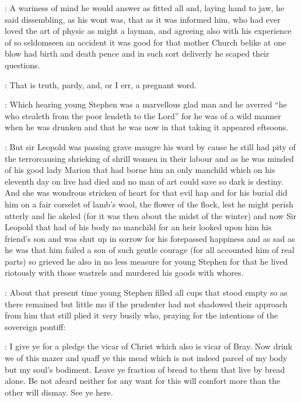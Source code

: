:
A wariness of mind he would answer as fitted all and,
laying hand to
jaw,
he said dissembling,
as his wont was,
that as it was informed him,
who had ever loved the art of physic as might a layman,
and agreeing also
with his experience of so seldomseen an accident it was good for that
mother Church belike at one blow had birth and death pence and in such
sort deliverly he scaped their questions.

\dixon:
That is truth,
pardy,
and,
or I err,
a pregnant word.

:
Which hearing young Stephen was a marvellous glad man and he averred
“he who stealeth from the poor lendeth to the Lord” for he was of a wild
manner when he was drunken and that he was now in that taking it appeared
eftsoons.


:
But sir Leopold was passing grave maugre his word by cause he still
had pity of the terrorcausing shrieking of shrill women in their labour
and as he was minded of his good lady Marion that had borne him an only
manchild which on his eleventh day on live had died and no man of art
could save so dark is destiny.
And she was wondrous stricken of heart for
that evil hap and for his burial did him on a fair corselet of lamb's
wool,
the flower of the flock,
lest he might perish utterly and lie
akeled (for it was then about the midst of the winter) and now Sir
Leopold that had of his body no manchild for an heir looked upon him his
friend's son and was shut up in sorrow for his forepassed happiness and
as sad as he was that him failed a son of such gentle courage (for all
accounted him of real parts) so grieved he also in no less measure for
young Stephen for that he lived riotously with those wastrels and
murdered his goods with whores.



:
About that present time young Stephen filled all cups that stood
empty so as there remained but little mo if the prudenter had not shadowed
their approach from him that still plied it very busily who,
praying for
the intentions of the sovereign pontiff:

\stephen:
I give ye for a pledge the vicar of Christ which also is vicar of
Bray.
Now drink we of this mazer and quaff ye this mead which is not
indeed parcel of my body but my soul's bodiment.
Leave ye fraction of
bread to them that live by bread alone.
Be not afeard neither for any want
for this will comfort more than the other will dismay.
See ye here.

